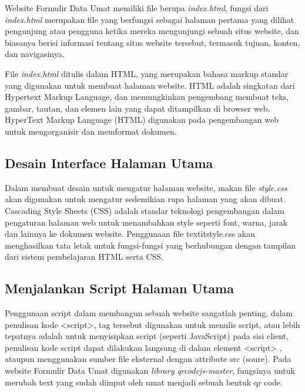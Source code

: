 Website Formulir Data Umat memiliki file berupa \textit{index.html}, fungsi dari \textit{index.html} merupakan file yang berfungsi sebagai halaman pertama yang dilihat pengunjung atau pengguna ketika mereka mengunjungi sebuah situs website, dan biasanya berisi informasi tentang situs website tersebut, termasuk tujuan, konten, dan navigasinya. 

File \textit{index.html} ditulis dalam HTML, yang merupakan bahasa markup standar yang digunakan untuk membuat halaman website. HTML adalah singkatan dari Hypertext Markup Language, dan memungkinkan pengembang membuat teks, gambar, tautan, dan elemen lain yang dapat ditampilkan di browser web. HyperText Markup Language (HTML) digunakan pada pengembangan web untuk mengorganisir dan memformat dokumen. \cite{indexcssScript}


\subsection{Desain Interface Halaman Utama}
\label{sec:style}

Dalam membuat desain untuk mengatur halaman website, makan file \textit{style.css} akan digunakan untuk mengatur sedemikian rupa halaman yang akan dibuat. Cascading Style Sheets (CSS) adalah standar teknologi pengembangan dalam pengaturan halaman web untuk menambahkan
style seperti font, warna, jarak dan lainnya ke dokumen website. Penggunaan file textit{style.css} akan menghasilkan tata letak untuk fungsi-fungsi yang berhubungan dengan tampilan dari sistem pembelajaran HTML serta CSS. \cite{indexcssScript}

\subsection{Menjalankan Script Halaman Utama}
\label{sec:script}

Penggunaan script dalam membangun sebuah website sangatlah penting, dalam penulisan kode <script>, tag tersebut digunakan untuk menulis script, atau lebih tepatnya adalah untuk menyisipkan script (seperti JavaScript) pada sisi client, penulisan kode script dapat dilakukan langsung di dalam element <script> , ataupun menggunakan sumber file eksternal dengan attribute src (soure). Pada website Formulir Data Umat digunakan \textit{library qrcodejs-master}, fungsinya untuk merubah text yang sudah diinput oleh umat menjadi sebuah bentuk qr code.




